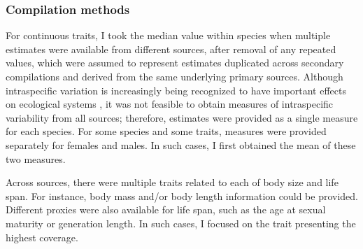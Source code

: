 \subsubsection{Compilation methods}
For continuous traits, I took the median value within species when multiple estimates were available from different sources, after removal of any repeated values, which were assumed to represent estimates duplicated across secondary compilations and derived from the same underlying primary sources. Although intraspecific variation is increasingly being recognized to have important effects on ecological systems \citep{Bolnick2011, Siefert2015, DesRoches2018, GonzalezSuarez2012a}, it was not feasible to obtain measures of intraspecific variability from all sources; therefore, estimates were provided as a single measure for each species. For some species and some traits, measures were provided separately for females and males. In such cases, I first obtained the mean of these two measures.

Across sources, there were multiple traits related to each of body size and life span. For instance, body mass and/or body length information could be provided. Different proxies were also available for life span, such as the age at sexual maturity or generation length. In such cases, I focused on the trait presenting the highest coverage.

